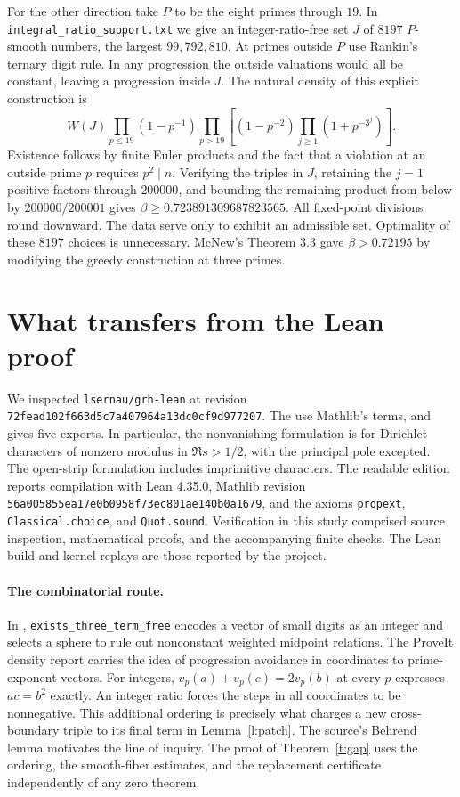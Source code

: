 \documentclass[11pt]{article}
\begin{document}
For the other direction take $P$ to be the eight primes through $19$. In \texttt{integral\_ratio\_support.txt} we give an integer-ratio-free set $J$ of $8197$ $P$-smooth numbers, the largest $99,792,810$. At primes outside $P$ use Rankin's ternary digit rule. In any progression the outside valuations would all be constant, leaving a progression inside $J$. The natural density of this explicit construction is
\[
 W(J)\prod_{p\le19}(1-p^{-1})
 \prod_{p>19}\left[(1-p^{-2})\prod_{j\ge1}(1+p^{-3^j})\right].
\]
Existence follows by finite Euler products and the fact that a violation at an outside prime $p$ requires $p^2\mid n$. Verifying the triples in $J$, retaining the $j=1$ positive factors through $200000$, and bounding the remaining product from below by $200000/200001$ gives $\beta\ge0.723891309687823565$. All fixed-point divisions round downward. The data serve only to exhibit an admissible set. Optimality of these $8197$ choices is unnecessary. McNew's Theorem 3.3 gave $\beta>0.72195$ by modifying the greedy construction at three primes.
\section{What transfers from the Lean proof}\label{sec:lean}
We inspected \texttt{lsernau/grh-lean} at revision \nolinkurl{72fead102f663d5c7a407964a13dc0cf9d977207}. The  use Mathlib's terms, and  gives five exports. In particular, the nonvanishing formulation is for Dirichlet characters of nonzero modulus in $\Re s>1/2$, with the principal pole excepted. The open-strip formulation includes imprimitive characters. The readable edition reports compilation with Lean 4.35.0, Mathlib revision \nolinkurl{56a005855ea17e0b0958f73ec801ae140b0a1679}, and the axioms \texttt{propext}, \texttt{Classical.choice}, and \texttt{Quot.sound}. Verification in this study comprised source inspection, mathematical proofs, and the accompanying finite checks. The Lean build and kernel replays are those reported by the project.

\paragraph{The combinatorial route.}
In , \texttt{exists\_three\_term\_free} encodes a vector of small digits as an integer and selects a sphere to rule out nonconstant weighted midpoint relations. The ProveIt density report carries the idea of progression avoidance in coordinates to prime-exponent vectors. For integers, $v_p(a)+v_p(c)=2v_p(b)$ at every $p$ expresses $ac=b^2$ exactly. An integer ratio forces the steps in all coordinates to be nonnegative. This additional ordering is precisely what charges a new cross-boundary triple to its final term in Lemma~\ref{l:patch}. The source's Behrend lemma motivates the line of inquiry. The proof of Theorem~\ref{t:gap} uses the ordering, the smooth-fiber estimates, and the replacement certificate independently of any zero theorem.
\end{document}
